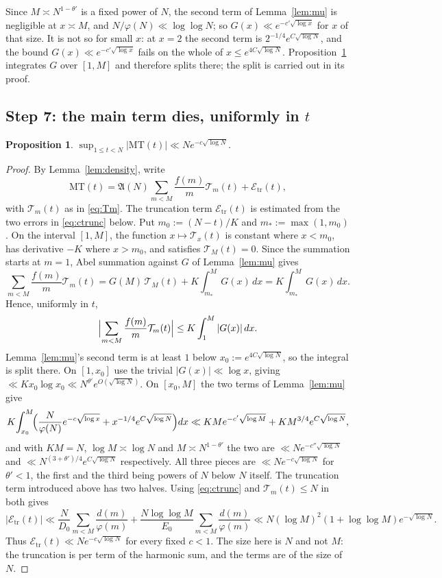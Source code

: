 \documentclass[11pt,a4paper]{article}
\theoremstyle{plain}
\newtheorem{proposition}[theorem]{Proposition}
\theoremstyle{definition}
\theoremstyle{remark}
\newcommand{\AAA}{\mathfrak{A}}
\newcommand{\Tcut}{\mathcal T}
\begin{document}
Since $M\asymp N^{1-\theta'}$ is a fixed power of $N$, the second term of
Lemma~\ref{lem:mu} is negligible at $x\asymp M$, and
$N/\varphi(N)\ll\log\log N$; so $G(x)\ll e^{-c'\sqrt{\log x}}$ for $x$
of that size. It is not so for small $x$: at $x=2$ the second term is
$2^{-1/4}e^{C\sqrt{\log N}}$, and the bound
$G(x)\ll e^{-c'\sqrt{\log x}}$ fails on the whole of
$x\le e^{4C\sqrt{\log N}}$. Proposition~\ref{prop:MT} integrates $G$
over $[1,M]$ and therefore splits there; the split is carried out in
its proof.

\subsection{Step 7: the main term dies, uniformly in
\texorpdfstring{$t$}{t}}

\begin{proposition}\label{prop:MT}
$\displaystyle\sup_{1\le t<N}|\mathrm{MT}(t)|\ll Ne^{-c\sqrt{\log N}}$.
\end{proposition}

\begin{proof}
By Lemma~\ref{lem:density}, write
\[
\mathrm{MT}(t)=\AAA(N)\sum_{m<M}\frac{f(m)}{m}\Tcut_m(t)
+\mathcal E_{\mathrm{tr}}(t),
\]
with $\Tcut_m(t)$ as in \eqref{eq:Tm}.  The truncation term
$\mathcal E_{\mathrm{tr}}(t)$ is estimated from the two errors in
\eqref{eq:ctrunc} below. Put $m_0:=(N-t)/K$ and $m_*:=\max(1,m_0)$.  On the interval
$[1,M]$, the function $x\mapsto\Tcut_x(t)$ is constant where
$x<m_0$, has derivative $-K$ where $x>m_0$, and satisfies
$\Tcut_M(t)=0$.  Since the summation starts at $m=1$, Abel summation
against $G$ of Lemma~\ref{lem:mu} gives
\[
  \sum_{m<M}\frac{f(m)}{m}\Tcut_m(t)
  = G(M)\,\Tcut_M(t)+K\!\int_{m_*}^{M}\!G(x)\,dx
  = K\!\int_{m_*}^{M}\!G(x)\,dx .
\]
Hence, uniformly in $t$,
\[
  \Bigl|\sum_{m<M}\frac{f(m)}{m}\Tcut_m(t)\Bigr|
  \le K\int_{1}^{M}|G(x)|\,dx .
\]
Lemma~\ref{lem:mu}'s second term is at least $1$ below
$x_0:=e^{4C\sqrt{\log N}}$, so the integral is split there. On
$[1,x_0]$ use the trivial $|G(x)|\ll\log x$, giving
$\ll Kx_0\log x_0\ll N^{\theta'}e^{O(\sqrt{\log N})}$. On $[x_0,M]$ the
two terms of Lemma~\ref{lem:mu} give
\[
  K\!\int_{x_0}^{M}\!\Bigl(\frac{N}{\varphi(N)}e^{-c\sqrt{\log x}}
    +x^{-1/4}e^{C\sqrt{\log N}}\Bigr)dx
  \ll KMe^{-c'\sqrt{\log M}}+KM^{3/4}e^{C\sqrt{\log N}},
\]
and with $KM=N$, $\log M\asymp\log N$ and $M\asymp N^{1-\theta'}$ the two are
$\ll Ne^{-c''\sqrt{\log N}}$ and $\ll N^{(3+\theta')/4}e^{C\sqrt{\log N}}$
respectively. All three pieces are $\ll Ne^{-c\sqrt{\log N}}$ for
$\theta'<1$, the first and the third being powers of $N$ below $N$
itself. The truncation term introduced above has two halves.  Using
\eqref{eq:ctrunc} and $\Tcut_m(t)\le N$ in both gives
\[
 |\mathcal E_{\mathrm{tr}}(t)|
 \ll \frac{N}{D_0}\sum_{m<M}\frac{d(m)}{\varphi(m)}
 +\frac{N\log\log M}{E_0}
   \sum_{m<M}\frac{d(m)}{\varphi(m)}
 \ll N(\log M)^2(1+\log\log M)e^{-\sqrt{\log N}}.
\]
Thus $\mathcal E_{\mathrm{tr}}(t)\ll Ne^{-c\sqrt{\log N}}$ for every fixed $c<1$.
The size here is $N$ and not
$M$: the truncation is per term of the harmonic sum, and the terms are
of the size of $N$.
\end{proof}
\end{document}

